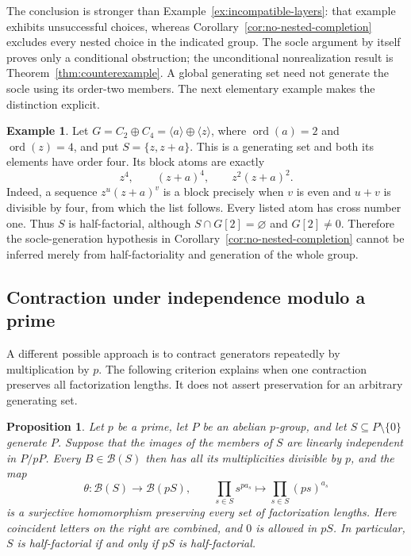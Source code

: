 \documentclass[11pt,reqno]{amsart}
\numberwithin{equation}{section}
\newtheorem{proposition}[theorem]{Proposition}
\theoremstyle{definition}
\newtheorem{example}[theorem]{Example}
\theoremstyle{remark}
\newcommand{\B}{\mathcal B}
\DeclareMathOperator{\ord}{ord}
\begin{document}
The conclusion is stronger than Example~\ref{ex:incompatible-layers}:
that example exhibits unsuccessful choices, whereas
Corollary~\ref{cor:no-nested-completion} excludes every nested
choice in the indicated group. The socle argument by itself proves only a conditional obstruction;
the unconditional nonrealization result is
Theorem~\ref{thm:counterexample}. A global generating set need
not generate the socle using its order-two members.
The next elementary example makes the distinction explicit.

\begin{example}\label{ex:socle-not-generated}
Let $G=C_2\oplus C_4=\langle a\rangle\oplus\langle z\rangle$,
where $\ord(a)=2$ and $\ord(z)=4$, and put $S=\{z,z+a\}$.
This is a generating set and both its elements have order four.
Its block atoms are exactly
\[
 z^4,\qquad (z+a)^4,\qquad z^2(z+a)^2.
\]
Indeed, a sequence $z^u(z+a)^v$ is a block precisely when
$v$ is even and $u+v$ is divisible by four, from which the list
follows. Every listed atom has cross number one. Thus $S$ is
half-factorial, although $S\cap G[2]=\varnothing$ and
$G[2]\ne0$. Therefore the socle-generation hypothesis in
Corollary~\ref{cor:no-nested-completion} cannot be inferred merely
from half-factoriality and generation of the whole group.
\end{example}

\subsection{Contraction under independence modulo a prime}

A different possible approach is to contract generators repeatedly
by multiplication by $p$. The following criterion explains when
one contraction preserves all factorization lengths. It does not
assert preservation for an arbitrary generating set.

\begin{proposition}\label{prop:independent-contraction}
Let $p$ be a prime, let $P$ be an abelian $p$-group, and let
$S\subseteq P\setminus\{0\}$ generate $P$. Suppose that the
images of the members of $S$ are linearly independent in $P/pP$.
Every $B\in\B(S)$ then has all its multiplicities divisible
by $p$, and the map
\[
 \theta:\B(S)\longrightarrow\B(pS),\qquad
 \prod_{s\in S}s^{p a_s}\longmapsto
 \prod_{s\in S}(ps)^{a_s}
\]
is a surjective homomorphism preserving every set of factorization
lengths. Here coincident letters on the right are combined, and
$0$ is allowed in $pS$. In particular, $S$ is half-factorial
if and only if $pS$ is half-factorial.
\end{proposition}
\end{document}
